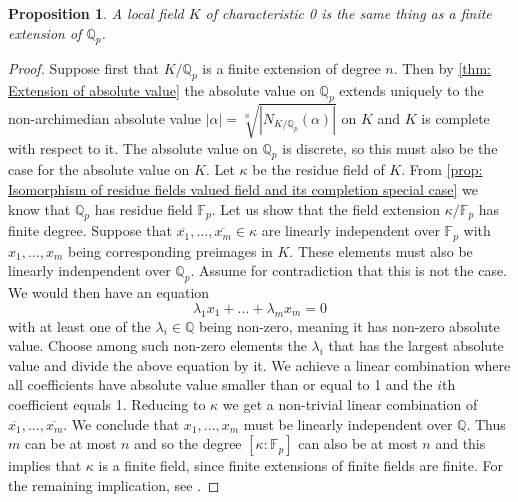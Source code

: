 \documentclass{article}
\newtheorem{proposition}{Proposition}[section]
\newcommand{\mfrak}[1]{\mathfrak{#1}}
\newcommand{\mbb}[1]{\mathbb{#1}}
\numberwithin{equation}{section}
\begin{document}
\begin{proposition}\label{prop: Characterization of local fields}
	A local field $K$ of characteristic 0 is the same thing as a finite extension of $\mbb Q_p$.
\end{proposition}
\begin{proof}
	Suppose first that $K /\mbb Q_p$ is a finite extension of degree $n$. Then by \cref{thm: Extension of absolute value} the absolute value on $\mbb Q_p$ extends uniquely to the non-archimedian absolute value $|\alpha| = \sqrt[n]{|N_{K/\mbb Q_p}(\alpha)|}$ on $K$ and $K$ is complete with respect to it. The absolute value on $\mbb Q_p$ is discrete, so this must also be the case for the absolute value on $K$. Let $\kappa$ be the residue field of $K$. From \cref{prop: Isomorphism of residue fields valued field and its completion special case} we know that $\mbb Q_p$ has residue field $\mbb F_p$. Let us show that the field extension $\kappa / \mbb F_p$ has finite degree. Suppose that $\overline {x_1}, ..., \overline{x_m} \in \kappa$ are linearly independent over $\mbb F_p$ with $x_1, ..., x_m$ being corresponding preimages in $K$. These elements must also be linearly indenpendent over $\mbb Q_p$. Assume for contradiction that this is not the case. We would then have an equation
	$$\lambda_1 x_1 + ... + \lambda_m x_m = 0$$
	with at least one of the $\lambda_i \in \mbb Q$ being non-zero, meaning it has non-zero absolute value. Choose among such non-zero elements the $\lambda_i$ that has the largest absolute value and divide the above equation by it. We achieve a linear combination where all coefficients have absolute value smaller than or equal to 1 and the $i$th coefficient equals 1. Reducing to $\kappa$ we get a non-trivial linear combination of $\overline{x_1}, ..., \overline{x_m}$. We conclude that $x_1, ..., x_m$ must be linearly independent over $\mbb Q$. Thus $m$ can be at most $n$ and so the degree $[\kappa : \mbb F_p]$ can also be at most $n$ and this implies that $\kappa$ is a finite field, since finite extensions of finite fields are finite. For the remaining implication, see \citep[Proposition 5.2]{neukirch}.



\end{proof}
\end{document}
